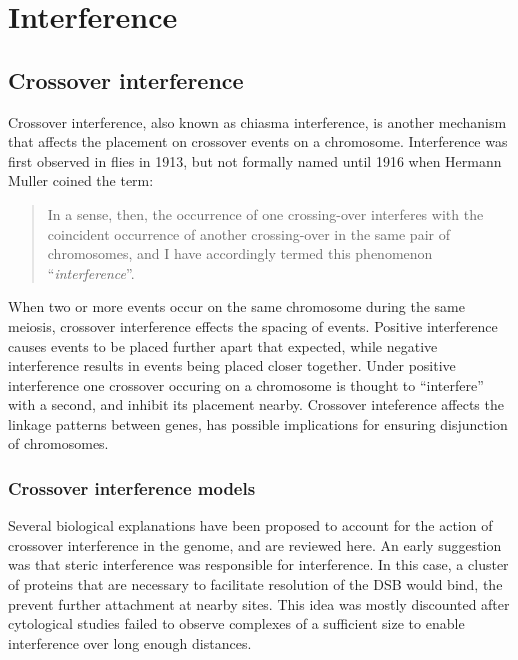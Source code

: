 \section{Interference}

\subsection{Crossover interference}

Crossover interference, also known as chiasma interference, is another mechanism that affects the placement on crossover events on a chromosome.
Interference was first observed in flies in 1913\cite{Sturtevant1913}, but not formally named until 1916 when Hermann Muller coined the term:
\begin{quote}
    In a sense, then, the occurrence of one crossing-over interferes with the coincident occurrence of another crossing-over in the same pair of chromosomes, and I have accordingly termed this phenomenon ``\textit{interference}''.
\end{quote}
%
When two or more events occur on the same chromosome during the same meiosis, crossover interference effects the spacing of events.
Positive interference causes events to be placed further apart that expected, while negative interference results in events being placed closer together.
Under positive interference one crossover occuring on a chromosome is thought to ``interfere'' with a second, and inhibit its placement nearby.
Crossover inteference affects the linkage patterns between genes, has possible implications for ensuring disjunction of chromosomes.




\subsubsection{Crossover interference models}

Several biological explanations have been proposed to account for the action of crossover interference in the genome, and are reviewed here.
An early suggestion was that steric interference was responsible for interference.
In this case, a cluster of proteins that are necessary to facilitate resolution of the DSB would bind, the prevent further attachment at nearby sites.
This idea was mostly discounted after cytological studies failed to observe complexes of a sufficient size to enable interference over long enough distances.

